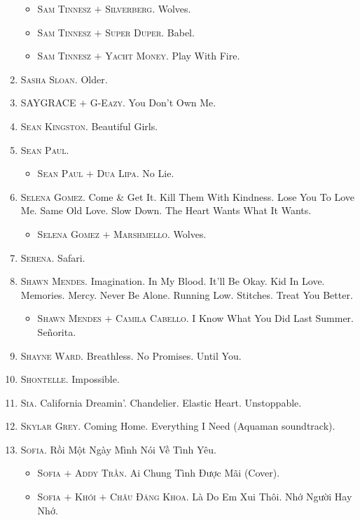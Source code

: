 \documentclass[oneside]{book}
\numberwithin{equation}{section}
\begin{document}
\begin{enumerate}
	\begin{itemize}
		\item \textsc{Sam Tinnesz $+$ Silverberg.} Wolves.
		\item \textsc{Sam Tinnesz $+$ Super Duper.} Babel.
		\item \textsc{Sam Tinnesz $+$ Yacht Money.} Play With Fire.
	\end{itemize}
	\item \textsc{Sasha Sloan.} Older.
	\item \textsc{SAYGRACE $+$ G-Eazy.} You Don't Own Me.
	\item \textsc{Sean Kingston.} Beautiful Girls.
	\item \textsc{Sean Paul.}
	\begin{itemize}
		\item \textsc{Sean Paul $+$ Dua Lipa.} No Lie.
	\end{itemize}
	\item \textsc{Selena Gomez.} Come \& Get It. Kill Them With Kindness. Lose You To Love Me. Same Old Love. Slow Down. The Heart Wants What It Wants.
	\begin{itemize}
		\item \textsc{Selena Gomez $+$ Marshmello.} Wolves.
	\end{itemize}
	\item \textsc{Serena.} Safari.
	\item \textsc{Shawn Mendes.} Imagination. In My Blood. It'll Be Okay. Kid In Love. Memories. Mercy. Never Be Alone. Running Low. Stitches. Treat You Better.
	\begin{itemize}
		\item \textsc{Shawn Mendes $+$ Camila Cabello.} I Know What You Did Last Summer. Se\~norita.
	\end{itemize}
	\item \textsc{Shayne Ward.} Breathless. No Promises. Until You.
	\item \textsc{Shontelle.} Impossible.
	\item \textsc{Sia.} California Dreamin'. Chandelier. Elastic Heart. Unstoppable.
	\item \textsc{Skylar Grey.} Coming Home. Everything I Need (Aquaman soundtrack).
	\item \textsc{Sofia.} Rồi Một Ngày Mình Nói Về Tình Yêu.
	\begin{itemize}
		\item \textsc{Sofia $+$ Addy Trần.} Ai Chung Tình Được Mãi (Cover).
		\item \textsc{Sofia $+$ Khói $+$ Châu Đăng Khoa.} Là Do Em Xui Thôi. Nhớ Người Hay Nhớ.

\end{itemize}
\end{enumerate}
\end{document}
